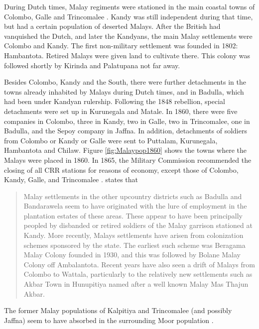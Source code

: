 During Dutch times, Malay regiments were stationed in the  main coastal towns of Colombo, Galle and Trincomalee  \citep[50]{Hussainmiya1990}.
Kandy was still independent during that time, but had a certain population of deserted Malays.
After the British had vanquished the Dutch, and later the Kandyans, the main Malay settlements were Colombo and Kandy. The first non-military settlement was founded in 1802: Hambantota. Retired Malays were given land to cultivate there. This colony  was followed shortly by Kirinda and Palatupana not far away.

Besides Colombo, Kandy and the South, there were further
detachments in the towns already inhabited by Malays during Dutch
times, and in Badulla, which had been under Kandyan rulership. Following the 1848 rebellion, special detachments
were set up in Kurunegala and Matale. In 1860, there were five
companies in Colombo, three in Kandy, two in Galle, two in Trincomalee,
one in Badulla, and  the Sepoy company in Jaffna. In addition,
detachments of soldiers from Colombo or Kandy or Galle were sent
to Puttalam, Kurunegala, Hambantota and Chilaw. Figure
\ref{fig:Malaypop1860} shows the towns where the Malays were
placed in 1860. In 1865, the Military Commission recommended the
closing of all CRR stations for reasons of economy, except those
of Colombo, Kandy, Galle, and Trincomalee \citep[101]{Hussainmiya1990}. \citet[425ff]{Hussein2007} states that
\begin{quote}
Malay settlements in the other upcountry districts such as Badulla and Bandarawela seem to have originated with the lure of employment in the plantation estates of these areas. These appear to have been principally peopled by disbanded or retired soldiers of the Malay garrison stationed at Kandy. More recently, Malays settlements have arisen from colonization schemes sponsored by the state. The earliest such scheme was Beragama Malay Colony founded in 1930, and this was followed by Bolane Malay Colony off Ambalantota. Recent years have also seen a drift of Malays from Colombo to Wattala, particularly to the relatively new settlements such as Akbar Town in Hunupitiya named after a well known Malay Mas Thajun Akbar. \citep[425f]{Hussein2007}
\end{quote}
The former Malay populations of Kalpitiya and Trincomalee (and possibly Jaffna) seem to have absorbed in the surrounding Moor population \citep[37,426f]{Hussein2007}.


